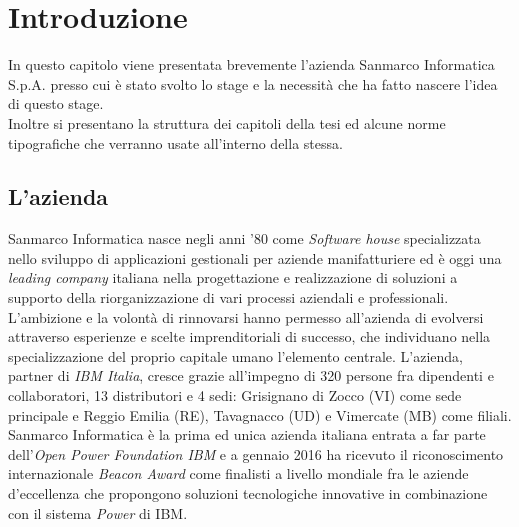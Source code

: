 
\chapter{Introduzione}
\label{cap:introduzione}

In questo capitolo viene presentata brevemente l'azienda Sanmarco Informatica S.p.A. presso cui è stato svolto lo stage e la necessità che ha fatto nascere l'idea di questo stage.\\
Inoltre si presentano la struttura dei capitoli della tesi ed alcune norme tipografiche che verranno usate all’interno della stessa. \\




\section{L'azienda}

Sanmarco Informatica nasce negli anni '80 come \textit{Software house} specializzata nello sviluppo di applicazioni gestionali per aziende manifatturiere ed è oggi una \textit{leading company} italiana nella progettazione e realizzazione di soluzioni a supporto della riorganizzazione di vari processi aziendali e professionali. L'ambizione e la volontà di rinnovarsi hanno permesso all'azienda di evolversi attraverso esperienze  e scelte imprenditoriali di successo, che individuano nella specializzazione del proprio capitale umano l'elemento centrale. L'azienda, partner di \textit{IBM Italia}, cresce grazie all'impegno di 320 persone fra dipendenti e collaboratori, 13 distributori e 4 sedi: Grisignano di Zocco (VI) come sede principale e Reggio Emilia (RE), Tavagnacco (UD) e Vimercate (MB) come filiali.
Sanmarco Informatica è la prima ed unica azienda italiana entrata a far parte dell'\textit{Open Power Foundation IBM} e a gennaio 2016 ha ricevuto il riconoscimento internazionale \textit{Beacon Award} come finalisti a livello mondiale fra le aziende d'eccellenza che propongono soluzioni tecnologiche innovative in combinazione con il sistema \textit{Power} di IBM.




